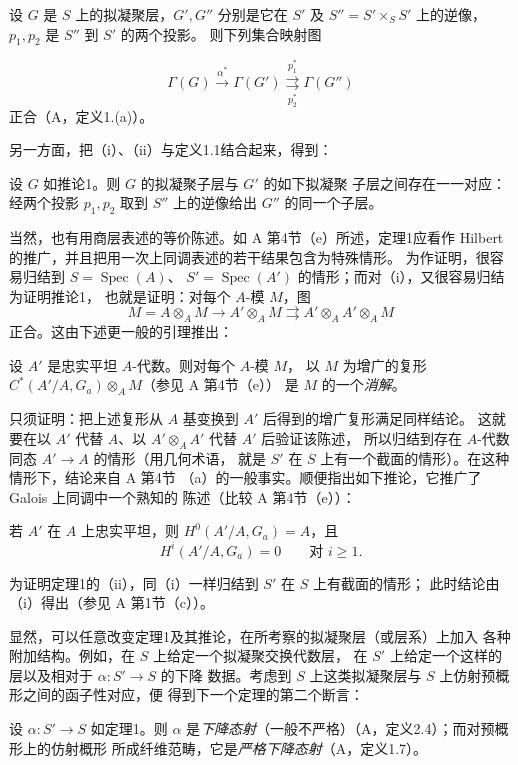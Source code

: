  设 $G$ 是 $S$ 上的拟凝聚层，$G',G''$ 分别是它在 $S'$
及 $S''=S'\times_SS'$ 上的逆像，$p_1,p_2$ 是 $S''$ 到 $S'$ 的两个投影。
则下列集合映射图

\[
  \Gamma(G)\xrightarrow{\alpha^*}\Gamma(G')
  \underset{p_2^*}{\overset{p_1^*}{\rightrightarrows}}\Gamma(G'')
\]
正合（A，定义1.(a)）。

另一方面，把（i）、（ii）与定义1.1结合起来，得到：

 设 $G$ 如推论1。则 $G$ 的拟凝聚子层与 $G'$ 的如下拟凝聚
子层之间存在一一对应：经两个投影 $p_1,p_2$ 取到 $S''$ 上的逆像给出
$G''$ 的同一个子层。

当然，也有用商层表述的等价陈述。如 A 第4节（e）所述，定理1应看作 Hilbert
的推广，并且把用一次上同调表述的若干结果包含为特殊情形。
为作证明，很容易归结到 $S=\operatorname{Spec}(A)$、
$S'=\operatorname{Spec}(A')$ 的情形；而对（i），又很容易归结为证明推论1，
也就是证明：对每个 $A$-模 $M$，图
\[
  M=A\otimes_A M\longrightarrow A'\otimes_A M
  \rightrightarrows A'\otimes_AA'\otimes_A M
\]
正合。这由下述更一般的引理推出：

 设 $A'$ 是忠实平坦 $A$-代数。则对每个 $A$-模 $M$，
以 $M$ 为增广的复形 $C^*(A'/A,G_a)\otimes_A M$（参见 A 第4节（e））
是 $M$ 的一个\emph{消解}。

只须证明：把上述复形从 $A$ 基变换到 $A'$ 后得到的增广复形满足同样结论。
这就要在以 $A'$ 代替 $A$、以 $A'\otimes_AA'$ 代替 $A'$ 后验证该陈述，
所以归结到存在 $A$-代数同态 $A'\longrightarrow A$ 的情形（用几何术语，
就是 $S'$ 在 $S$ 上有一个截面的情形）。在这种情形下，结论来自 A 第4节
（a）的一般事实。顺便指出如下推论，它推广了 Galois 上同调中一个熟知的
陈述（比较 A 第4节（e））：

 若 $A'$ 在 $A$ 上忠实平坦，则 $H^0(A'/A,G_a)=A$，且
\[
  H^i(A'/A,G_a)=0\qquad\text{对 $i\geq1$}.
\]

为证明定理1的（ii），同（i）一样归结到 $S'$ 在 $S$ 上有截面的情形；
此时结论由（i）得出（参见 A 第1节（c））。

显然，可以任意改变定理1及其推论，在所考察的拟凝聚层（或层系）上加入
各种附加结构。例如，在 $S$ 上给定一个拟凝聚交换代数层，
在 $S'$ 上给定一个这样的层以及相对于 $\alpha:S'\longrightarrow S$ 的下降
数据。考虑到 $S$ 上这类拟凝聚层与 $S$ 上仿射预概形之间的函子性对应，便
得到下一个定理的第二个断言：

 设 $\alpha:S'\longrightarrow S$ 如定理1。则 $\alpha$
是\emph{下降态射}（一般不严格）（A，定义2.4）；而对预概形上的仿射概形
所成纤维范畴，它是\emph{严格下降态射}（A，定义1.7）。

